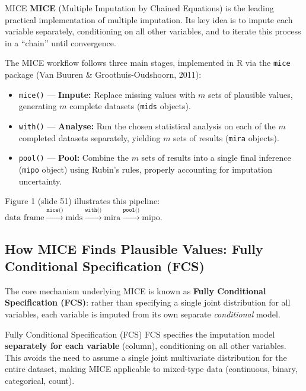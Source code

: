 \documentclass[11pt]{article}
\theoremstyle{smallexample}
\begin{document}
 \begin{defbox}{MICE}
  \textbf{MICE} (Multiple Imputation by Chained Equations) is the leading practical
  implementation of multiple imputation. Its key idea is to impute each variable
  separately, conditioning on all other variables, and to iterate this process in a
  ``chain'' until convergence.
 \end{defbox}

The MICE workflow follows three main stages, implemented in R via the \texttt{mice}
package (Van Buuren \& Groothuis-Oudshoorn, 2011):

 \begin{itemize}
  \item \texttt{mice()} — \textbf{Impute:} Replace missing values with $m$ sets of
    plausible values, generating $m$ complete datasets (\texttt{mids} objects).

  \vspace{0.2cm}
  \item \texttt{with()} — \textbf{Analyse:} Run the chosen statistical analysis on
    each of the $m$ completed datasets separately, yielding $m$ sets of results
    (\texttt{mira} objects).

  \vspace{0.2cm}
  \item \texttt{pool()} — \textbf{Pool:} Combine the $m$ sets of results into a
    single final inference (\texttt{mipo} object) using Rubin's rules, properly
    accounting for imputation uncertainty.
 \end{itemize}

\noindent
Figure 1 (slide 51) illustrates this pipeline:
$\text{data frame} \xrightarrow{\texttt{mice()}} \text{mids}
\xrightarrow{\texttt{with()}} \text{mira}
\xrightarrow{\texttt{pool()}} \text{mipo}$.

\subsection{How MICE Finds Plausible Values: Fully Conditional Specification (FCS)}

The core mechanism underlying MICE is known as \textbf{Fully Conditional Specification
(FCS)}: rather than specifying a single joint distribution for all variables, each
variable is imputed from its own separate \emph{conditional} model.

 \begin{defbox}{Fully Conditional Specification (FCS)}
  FCS specifies the imputation model \textbf{separately for each variable} (column),
  conditioning on all other variables. This avoids the need to assume a single joint
  multivariate distribution for the entire dataset, making MICE applicable to
  mixed-type data (continuous, binary, categorical, count).
 \end{defbox}
\end{document}
